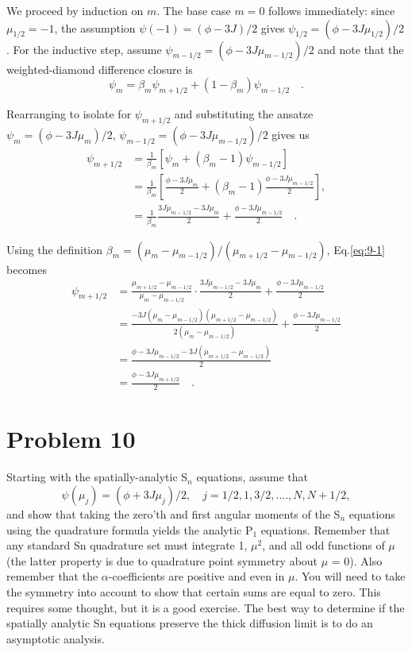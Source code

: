 \begin{mybox}
  We proceed by induction on $m$. The base case $m=0$ follows immediately: since $\mu_{1/2} = -1$, the assumption $\psi(-1) = (\phi-3J)/2$ gives $\psi_{1/2} = (\phi - 3J\mu_{1/2})/2$. For the inductive step, assume $\psi_{m-1/2} = (\phi-3J\mu_{m-1/2})/2$ and note that the weighted-diamond difference closure is
  \begin{equation*}
    \psi_m = \beta_m \psi_{m+1/2} + (1-\beta_m)\psi_{m-1/2}\quad .
  \end{equation*}
  
  Rearranging to isolate for $\psi_{m+1/2}$ and substituting the ansatze $\psi_m = (\phi-3J\mu_m)/2$, $\psi_{m-1/2} = (\phi-3J\mu_{m-1/2})/2$ gives us
  \begin{align}
    \psi_{m+1/2} &= \frac{1}{\beta_m} [\psi_m + (\beta_m -1)\psi_{m-1/2}]\nonumber \\
    &=\frac{1}{\beta_m} \left[\frac{\phi-3J\mu_m}{2} + (\beta_m-1)\frac{\phi-3J\mu_{m-1/2}}{2}\right], \nonumber\\
    &= \frac{1}{\beta_m} \frac{3J\mu_{m-1/2}-3J\mu_m}{2} + \frac{\phi-3J\mu_{m-1/2}}{2}\quad. \label{eq:9-1}
  \end{align}

  Using the definition $\beta_m = (\mu_m-\mu_{m-1/2}) / (\mu_{m+1/2}-\mu_{m-1/2})$, Eq.\eqref{eq:9-1} becomes
  \begin{align*}
    \psi_{m+1/2} &= \frac{\mu_{m+1/2}-\mu_{m-1/2}}{\mu_m-\mu_{m-1/2}} \cdot \frac{3J\mu_{m-1/2}-3J\mu_m}{2} + \frac{\phi-3J\mu_{m-1/2}}{2} \\
    &= \frac{-3J(\mu_m-\mu_{m-1/2})(\mu_{m+1/2}-\mu_{m-1/2})}{2(\mu_m-\mu_{m-1/2})} + \frac{\phi-3J\mu_{m-1/2}}{2} \\
    &= \frac{\phi - 3J\mu_{m-1/2} - 3J(\mu_{m+1/2}-\mu_{m-1/2})}{2} \\
    &= \frac{\phi - 3J\mu_{m+1/2}}{2}\quad.
  \end{align*}


\end{mybox}



\section*{Problem 10}
Starting with the spatially-analytic S$_n$ equations, assume that
\begin{equation*}
  \psi(\mu_j) = (\phi + 3J\mu_j )/2 , \quad j = 1/2, 1, 3/2, ...., N, N + 1/2,
\end{equation*}
and show that taking the zero’th and ﬁrst angular moments of the S$_n$ equations using the quadrature formula yields the analytic P$_1$ equations. Remember that any standard Sn quadrature set must integrate 1, $\mu^2$, and all odd functions of $\mu$ (the latter property is due to quadrature point symmetry about $\mu$ = 0). Also remember that the $\alpha$-coefficients are positive and even in $\mu$. You will need to take the symmetry into account to show that certain sums are equal to zero. This requires some thought, but it is a good exercise. The best way to determine if the spatially analytic Sn equations preserve the thick diﬀusion limit is to do an asymptotic analysis.

